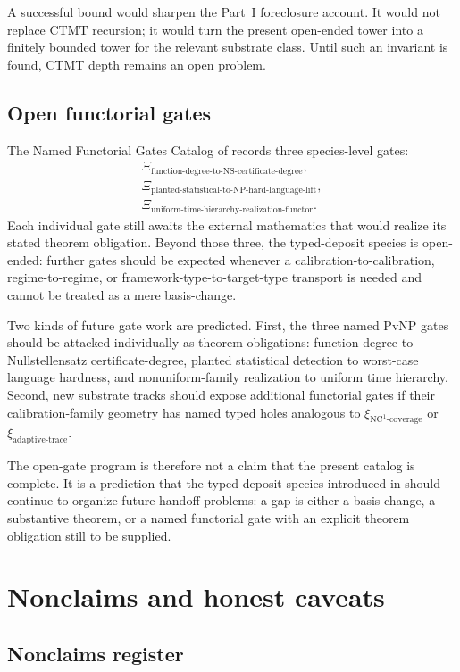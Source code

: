 \documentclass[11pt]{article}
\newcommand{\xiNCone}{\xi_{\text{NC}^{1}\text{-coverage}}}
\newcommand{\xiAdaptive}{\xi_{\text{adaptive-trace}}}
\newcommand{\GateFunctionDegree}{\Xi_{\text{function-degree-to-NS-certificate-degree}}}
\newcommand{\GatePlantedStatistical}{\Xi_{\text{planted-statistical-to-NP-hard-language-lift}}}
\newcommand{\GateUniformTime}{\Xi_{\text{uniform-time-hierarchy-realization-functor}}}
\theoremstyle{definition}
\begin{document}
A successful bound would sharpen the Part~I foreclosure account.  It
would not replace CTMT recursion; it would turn the present
open-ended tower into a finitely bounded tower for the relevant
substrate class.  Until such an invariant is found, CTMT depth remains
an open problem.

\subsection{Open functorial gates}
\label{sec:predictions:functorial-gates}

The Named Functorial Gates Catalog of
 records three species-level gates:
\[
  \begin{gathered}
    \GateFunctionDegree,\\
    \GatePlantedStatistical,\\
    \GateUniformTime .
  \end{gathered}
\]
Each individual gate still awaits the external mathematics that would
realize its stated theorem obligation.  Beyond those three, the
typed-deposit species is open-ended: further gates should be expected
whenever a calibration-to-calibration, regime-to-regime, or
framework-type-to-target-type transport is needed and cannot be
treated as a mere basis-change.

Two kinds of future gate work are predicted.  First, the three named
PvNP gates should be attacked individually as theorem obligations:
function-degree to Nullstellensatz certificate-degree, planted
statistical detection to worst-case language hardness, and
nonuniform-family realization to uniform time hierarchy.  Second,
new substrate tracks should expose additional functorial gates if
their calibration-family geometry has named typed holes analogous to
\(\xiNCone\) or \(\xiAdaptive\).

The open-gate program is therefore not a claim that the present
catalog is complete.  It is a prediction that the typed-deposit
species introduced in  should
continue to organize future handoff problems: a gap is either a
basis-change, a substantive theorem, or a named functorial gate with
an explicit theorem obligation still to be supplied.
 \section{Nonclaims and honest caveats}\label{sec:scope}

\subsection{Nonclaims register}\label{sec:scope:nonclaims}
\end{document}
